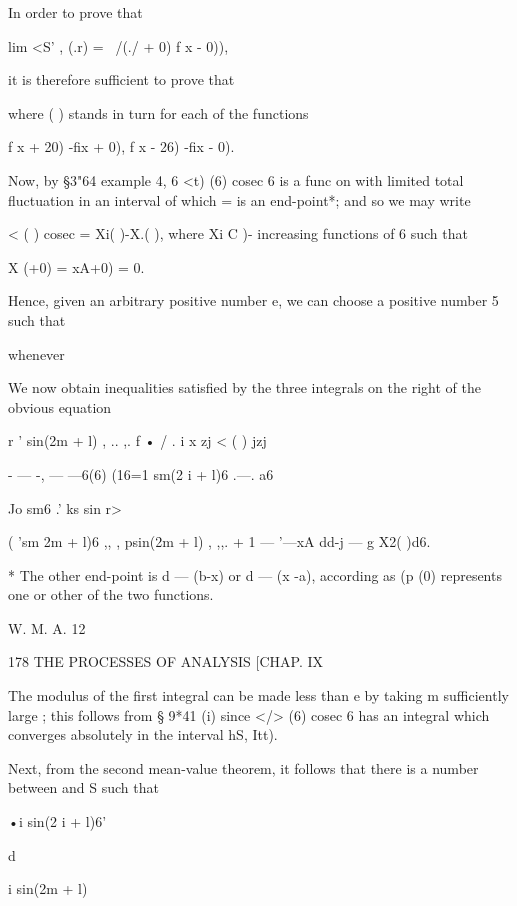 In order to prove that

lim <S' , (.r) = \ /(./ + 0) f x - 0)),

it is therefore sufficient to prove that

where ( ) stands in turn for each of the functions

f x + 20) -fix + 0), f x - 26) -fix - 0).

Now, by §3"64 example 4, 6 <t) (6) cosec 6 is a func on with limited
total fluctuation in an interval of which = is an end-point*; and so
we may write

  < ( ) cosec = Xi( )-X.( ), where Xi C )- %
increasing functions of 6 such that

X (+0) = xA+0) = 0.

Hence, given an arbitrary positive number e, we can choose a positive
number 5 such that

whenever %

We now obtain inequalities satisfied by the three integrals on the
right of the obvious equation

r ' sin(2m + l) , .. ,. f • / . i x zj < ( ) jzj

 - — -, — —6(6) (16=1 sm(2 i + l)6 .—. a6

Jo sm6 .' ks sin r>

( 'sm 2m + l)6 ,, , psin(2m + l) , ,,. + 1 — '—xA dd-j — g X2( )d6.

* The other end-point is d — (b-x) or d — (x -a), according as (p (0)
represents one or other of the two functions.

W. M. A. 12



178 THE PROCESSES OF ANALYSIS [CHAP. IX

The modulus of the first integral can be made less than e by taking m
sufficiently large ; this follows from § 9*41 (i) since </> (6) cosec
6 has an integral which converges absolutely in the interval hS, Itt).

Next, from the second mean-value theorem, it follows that there is a
number between and S such that



•i sin(2 i + l)6'







d



i sin(2m + l)



